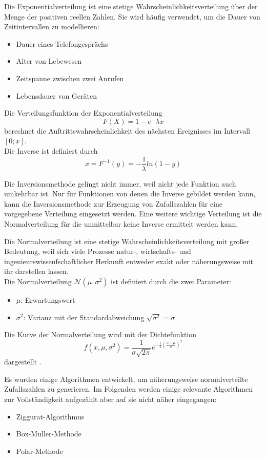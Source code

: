 Die Exponentialverteilung ist eine stetige Wahrscheinlichkeitsverteilung über der Menge der positiven reellen Zahlen. Sie wird häufig verwendet, um die Dauer von Zeitintervallen zu modellieren:
\begin{itemize}
    \item Dauer eines Telefongesprächs
    \item Alter von Lebewesen
    \item Zeitspanne zwischen zwei Anrufen
    \item Lebensdauer von Geräten
\end{itemize}
Die Verteilungsfunktion der Exponentialverteilung 
$$F(X)=1-e^-\lambda x$$
berechnet die Auftrittswahrscheinlichkeit des nächsten Ereignisses im Intervall $[0;x]$.\\
Die Inverse ist definiert durch
$$x=F^{-1}(y)=-\frac{1}{\lambda}ln(1-y)$$

Die Inversionsmethode gelingt nicht immer, weil nicht jede Funktion auch umkehrbar ist. Nur für Funktionen von denen die Inverse gebildet werden kann, kann die Inversionsmethode zur Erzeugung von Zufallszahlen für eine vorgegebene Verteilung eingesetzt werden. Eine weitere wichtige Verteilung ist die Normalverteilung für die unmittelbar keine Inverse ermittelt werden kann. 

Die Normalverteilung ist eine stetige Wahrscheinlichkeitsverteilung mit großer Bedeutung, weil sich viele Prozesse natur-, wirtschafts- und ingenieurswissenfschaftlicher Herkunft entweder exakt oder näherungsweise mit ihr darstellen lassen.\\ 
Die Normalverteilung $\mathcal{N}(\mu,\sigma ^2)$ ist definiert durch die zwei Parameter: 
\begin{itemize}
    \item $\mu$: Erwartungswert
    \item $\sigma^2$: Varianz mit der Standardabweichung $\sqrt{\sigma^2}=\sigma$
\end{itemize}
Die Kurve der Normalverteilung wird mit der Dichtefunktion
\medskip
$$f(x,\mu,\sigma^2)=\frac{1}{\sigma\sqrt{2\pi}}e^{-\frac{1}{2}(\frac{x-\mu}{\sigma})^2}$$
\medskip
dargestellt \cite{Inversionsmethode}.

Es wurden einige Algorithmen entwickelt, um näherungsweise normalverteilte Zufallszahlen zu generieren. Im Folgenden werden einige relevante Algorithmen zur Vollständigkeit aufgezählt aber auf sie nicht näher eingegangen:
\begin{itemize}
    \item Ziggurat-Algorithmus
    \item Box-Muller-Methode
    \item Polar-Methode
\end{itemize}

